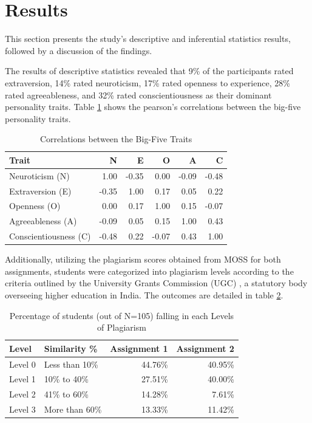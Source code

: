 \section{Results}
\label{sec:findings}
This section presents the study's descriptive and inferential statistics results, followed by a discussion of the findings.

The results of descriptive statistics revealed that 9\% of the participants rated extraversion, 14\% rated neuroticism, 17\% rated openness to experience, 28\% rated agreeableness, and 32\% rated conscientiousness as their dominant personality traits. Table \ref{tab:correl} shows the pearson's correlations between the big-five personality traits. 

\begin{table}[h]
  \centering
  \caption{Correlations between the Big-Five Traits\label{tab:correl}}
  \vspace{-12pt}
  \begin{tabular}{p{3cm}rrrrr}
    \toprule
    Trait & N & E & O & A & C \\\midrule
    Neuroticism (N) & 1.00 & -0.35 & 0.00 & -0.09 & -0.48 \\
    Extraversion (E) & -0.35 & 1.00 & 0.17 & 0.05 &	0.22 \\
    Openness (O) & 0.00 & 0.17 & 1.00 &	0.15 & -0.07 \\
    Agreeableness (A) & -0.09 &	0.05 & 0.15 & 1.00 & 0.43 \\ 
    Conscientiousness (C) & -0.48 & 0.22 & -0.07 &	0.43 &	1.00  \\\bottomrule
  \end{tabular}\vspace{-8pt}
\end{table}

Additionally, utilizing the plagiarism scores obtained from MOSS for both assignments, students were categorized into plagiarism levels according to the criteria outlined by the University Grants Commission (UGC) \cite{UGCPlagiarism}, a statutory body overseeing higher education in India. The outcomes are detailed in table \ref{tab:levelsPlagiarism}.


\begin{table}[h]
  \centering
  \caption{Percentage of students (out of N=105) falling in each Levels of Plagiarism \label{tab:levelsPlagiarism}}
  \vspace{-12pt}
  \begin{tabular}{p{1cm}p{2cm}rr}
    \toprule
    Level & Similarity \% & Assignment 1 & Assignment 2 \\\midrule
    Level 0 & Less than 10\% & 44.76\% & 40.95\% \\
    Level 1 & 10\% to 40\% & 27.51\% & 40.00\%  \\
    Level 2 & 41\% to 60\% & 14.28\% & 7.61\% \\
    Level 3 & More than 60\% &13.33\% & 11.42\% \\ \bottomrule
  \end{tabular}\vspace{-8pt}
\end{table}

